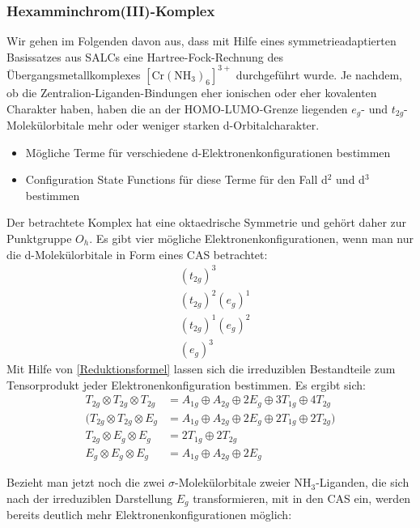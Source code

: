 \documentclass[9pt]{report}
\begin{document}
\subsubsection{Hexamminchrom(III)-Komplex}
Wir gehen im Folgenden davon aus, dass mit Hilfe eines symmetrieadaptierten Basissatzes aus SALCs eine Hartree-Fock-Rechnung des Übergangsmetallkomplexes $[\mathrm{Cr(NH_3)_6}]^{3+}$ durchgeführt wurde. Je nachdem, ob die Zentralion-Liganden-Bindungen eher ionischen oder eher kovalenten Charakter haben, haben die an der HOMO-LUMO-Grenze liegenden $e_g$- und $t_{2g}$-Molekülorbitale mehr oder weniger starken d-Orbitalcharakter.
\begin{itemize}
	\item Mögliche Terme für verschiedene d-Elektronenkonfigurationen bestimmen
	\item Configuration State Functions für diese Terme für den Fall d$^2$ und d$^3$ bestimmen
\end{itemize}
Der betrachtete Komplex hat eine oktaedrische Symmetrie und gehört daher zur Punktgruppe $O_h$. Es gibt vier mögliche Elektronenkonfigurationen, wenn man nur die d-Molekülorbitale in Form eines CAS betrachtet:
\begin{align}
& (t_{2g})^3 \\
& (t_{2g})^2(e_g)^1 \\
& (t_{2g})^1(e_g)^2 \\
& (e_g)^3
\end{align}
Mit Hilfe von \eqref{Reduktionsformel} lassen sich die irreduziblen Bestandteile zum Tensorprodukt jeder Elektronenkonfiguration bestimmen. Es ergibt sich:
\begin{align}
T_{2g}\otimes T_{2g}\otimes T_{2g} &= A_{1g}\oplus A_{2g}\oplus 2E_{g}\oplus 3T_{1g}\oplus 4T_{2g}\\
\big(T_{2g}\otimes T_{2g}\otimes E_{g} &= A_{1g}\oplus A_{2g}\oplus 2E_{g}\oplus 2T_{1g}\oplus 2T_{2g}\big)\\
T_{2g}\otimes E_{g}\otimes E_{g} &= 2T_{1g}\oplus 2T_{2g}\\
E_{g}\otimes E_{g}\otimes E_{g} &= A_{1g}\oplus A_{2g}\oplus 2E_{g}
\end{align}








Bezieht man jetzt noch die zwei $\sigma$-Molekülorbitale zweier NH$_3$-Liganden, die sich nach der irreduziblen Darstellung $E_g$ transformieren, mit in den CAS ein, werden bereits deutlich mehr Elektronenkonfigurationen möglich:
\end{document}
